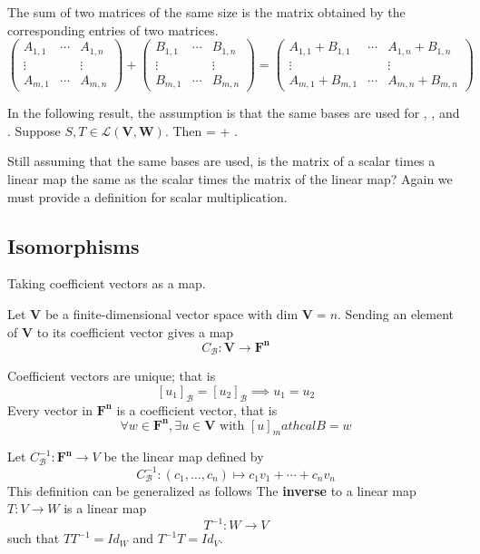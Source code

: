 \documentclass[11pt]{article} %
\newcommand\A[1]{\text{$A_{#1}$}}
\newcommand\B[1]{\text{$B_{#1}$}}
\newcommand\F[1]{\text{$\mathbf{F^{#1}}$}}
\newcommand\M[1]{\text{$\mathcal{M}(#1)$}}
\newcommand\V{\text{$\mathbf{V}$}}
\newcommand\W{\text{$\mathbf{W}$}}
\newcommand\0{\text{$\mathbf{0}$}}
\renewcommand\L[2]{\mathcal{L}(#1,#2)}
\newcommand\lc[3]{#1_1 #2_1 + \cdots + #1_{#3} #2_{#3}}
\newcommand\ls[2]{#1_1, \ldots, #1_{#2}}
\renewcommand\dim{\text{dim }}
\begin{document}
{
The sum of two matrices of the same size is the matrix obtained by the corresponding entries of two matrices.
$$
\begin{pmatrix}
\A{1,1} & \cdots & \A{1, n} \\
\vdots & & \vdots \\
\A{m, 1} & \cdots & \A{m, n}
\end{pmatrix} +
\begin{pmatrix}
\B{1,1} & \cdots & \B{1, n} \\
\vdots & & \vdots \\
\B{m, 1} & \cdots & \B{m, n}
\end{pmatrix} = 
\begin{pmatrix}
\A{1,1} + \B{1,1} & \cdots & \A{1,n} + \B{1, n} \\
\vdots & & \vdots \\
\A{m,1} + \B{m, 1} & \cdots & \A{m,n} + \B{m, n}
\end{pmatrix}
$$ 
}

In the following result, the assumption is that the same bases are used for \M{S}, \M{T}, and \M{S + T}.
{Suppose $S, T \in \L{\V}{\W}$. Then \M{S + T} = \M{S} + \M{T}.}
{}

Still assuming that the same bases are used, is the matrix of a scalar times a linear map the same as the scalar times the matrix of the linear map? Again we must provide a definition for scalar multiplication.

\newpage
\subsection{Isomorphisms}
Taking coefficient vectors as a map. 

{
Let $\V$ be a finite-dimensional vector space with $\dim \V = n$. Sending an element of $\V$ to its coefficient vector gives a map
$$
C_\mathcal{B} : \V \to \F{n}
$$
}

{
\points
{Coefficient vectors are unique; that is$$[u_1]_\mathcal{B} = [u_2]_\mathcal{B} \implies u_1 = u_2$$}
{Every vector in $\F{n}$ is a coefficient vector, that is $$\forall w \in \F{n}, \exists u \in \V \text{ with } [u]_mathcal{B} = w$$}
}

{Let $C^{-1}_\mathcal{B}: \F{n} \to V$ be the linear map defined by
$$
C^{-1}_\mathcal{B} : (\ls cn) \mapsto \lc cvn 
$$
}
This definition can be generalized as follows
{The \textbf{inverse} to a linear map $T : V \to W$ is a linear map $$T^{-1} : W \to V$$such that $TT^{-1} = Id_W$ and $T^{-1}T = Id_V$.}
\end{document}
